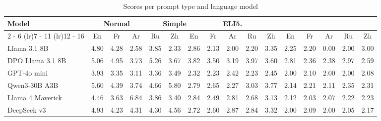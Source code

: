 \documentclass{article}%
\begin{document}
%
\normalsize%


\begin{table}[h!]%
\centering%
\small%
\setlength{\tabcolsep}{4pt}%
\begin{tabular}{@{}lccccccccccccccc@{}}%
\toprule%
\textbf{Model} & \multicolumn{3}{c}{\textbf{Normal}} & \multicolumn{3}{c}{\textbf{Simple}} & \multicolumn{3}{c}{\textbf{ELI5.}} \\%
\cmidrule(lr){2%
-%
6}%
\cmidrule(lr){7%
-%
11}%
\cmidrule(lr){12%
-%
16}%
&En&Fr&Ar&Ru&Zh&En&Fr&Ar&Ru&Zh&En&Fr&Ar&Ru&Zh\\%
\midrule%
Llama 3.1 8B&4.80&4.28&2.58&3.85&2.33&2.86&2.13&2.00&2.20&3.35&2.25&2.20&0.00&2.00&3.00\\%
DPO Llama 3.1 8B&5.06&4.95&3.73&5.26&3.67&3.82&3.50&3.19&3.97&3.60&2.81&2.36&2.38&2.97&2.59\\%
GPT{-}4o mini&3.93&3.35&3.11&3.36&3.49&2.32&2.23&2.42&2.23&2.45&2.00&2.10&2.00&2.00&2.08\\%
Qwen3{-}30B A3B&5.60&4.39&3.74&4.66&5.80&2.79&2.65&2.27&3.03&3.77&2.14&2.21&2.11&2.35&2.31\\%
Llama 4 Maverick&4.46&3.63&6.84&3.86&3.40&2.84&2.49&2.81&2.68&3.13&2.12&2.03&2.07&2.22&2.23\\%
DeepSeek v3&4.93&4.23&4.31&4.30&4.56&2.72&2.60&2.87&2.84&3.32&2.00&2.09&2.00&2.05&2.17\\\bottomrule%
%
\end{tabular}%
\caption{Scores per prompt type and language model}%
\end{table}

%
\end{document}
